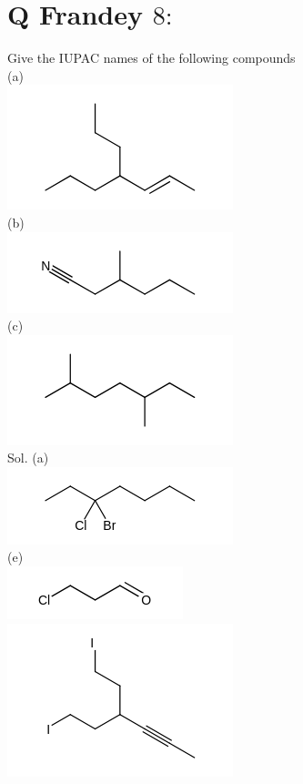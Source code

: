 \documentclass[10pt]{article}
\begin{document}
\section*{Q Frandey $8:$}
Give the IUPAC names of the following compounds\\
(a)\\
\includegraphics{smile-e782dde4c6763be247743c0cc0f75cd7977b4670}\\
(b)\\
\includegraphics{smile-173882f3548f3f0c361397001c98a955570299b4}\\
(c)\\
\includegraphics{smile-4075148ba46b899f1009e5082a0e3abee1deb334}\\
Sol. (a)\\
\includegraphics{smile-00a8191a9c2c65ef4c3fc5eb3f8bcdafaeaa333b}\\
(e)\\
\includegraphics{smile-266b6d00aff9dac334c03036776f872f845a1440}\\
\includegraphics{smile-39c038695fd2cccb547297847f3fe3a971dfa4c8}
\end{document}
